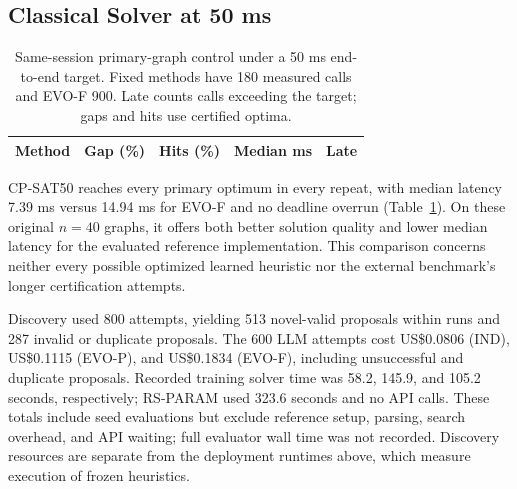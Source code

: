 \subsection{Classical Solver at 50 ms}
\begin{table}[!htbp]
\centering\small
\setlength{\tabcolsep}{3pt}
\caption{Same-session primary-graph control under a 50 ms end-to-end target.
Fixed methods have 180 measured calls and EVO-F 900. Late counts calls
exceeding the target; gaps and hits use certified optima.}
\label{tab:control}
\begin{tabular}{lrrrr}
\toprule
Method & Gap (\%) & Hits (\%) & Median ms & Late\\
\midrule

\end{tabular}
\end{table}

CP-SAT50 reaches every primary optimum in every repeat, with median
latency 7.39 ms versus 14.94 ms for EVO-F and no deadline overrun
(Table~\ref{tab:control}). On these original $n=40$ graphs, it offers both
better solution quality and lower median latency for the evaluated reference
implementation. This comparison concerns neither every possible optimized
learned heuristic nor the external benchmark's longer certification attempts.

Discovery used 800 attempts, yielding 513 novel-valid proposals within runs
and 287 invalid or duplicate proposals. The 600 LLM attempts cost
US\$0.0806 (IND), US\$0.1115 (EVO-P), and US\$0.1834 (EVO-F),
including unsuccessful and duplicate proposals. Recorded training solver
time was 58.2, 145.9, and 105.2 seconds, respectively; RS-PARAM used
323.6 seconds and no API calls. These totals include seed evaluations
but exclude reference setup, parsing, search overhead, and API waiting;
full evaluator wall time was not recorded. Discovery resources are
separate from the deployment runtimes above, which measure execution
of frozen heuristics.
